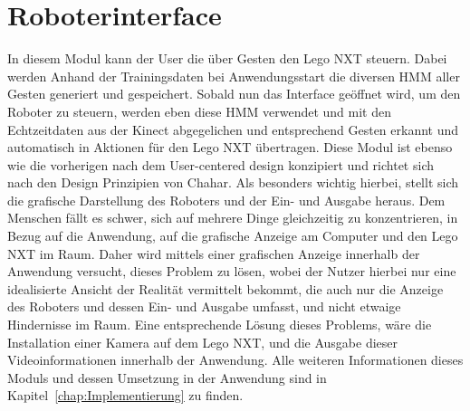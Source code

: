 \section{Roboterinterface}
In diesem Modul kann der User die \"uber Gesten den Lego NXT steuern. Dabei werden Anhand der Trainingsdaten bei Anwendungsstart die diversen \gls{HMM} aller Gesten generiert und gespeichert. Sobald nun das Interface ge\"offnet wird, um den Roboter zu steuern, werden eben diese HMM verwendet und mit den Echtzeitdaten aus der Kinect abgegelichen und entsprechend Gesten erkannt und automatisch in Aktionen f\"ur den Lego NXT \"ubertragen.
\newline
Diese Modul ist ebenso wie die vorherigen nach dem User-centered design konzipiert und richtet sich nach den Design Prinzipien von Chahar. Als besonders wichtig hierbei, stellt sich die grafische Darstellung des Roboters und der Ein- und Ausgabe heraus. Dem Menschen f\"allt es schwer, sich auf mehrere Dinge gleichzeitig zu konzentrieren, in Bezug auf die Anwendung, auf die grafische Anzeige am Computer und den Lego NXT im Raum. Daher wird mittels einer grafischen Anzeige innerhalb der Anwendung versucht, dieses Problem zu l\"osen, wobei der Nutzer hierbei nur eine idealisierte Ansicht der Realit\"at vermittelt bekommt, die auch nur die Anzeige des Roboters und dessen Ein- und Ausgabe umfasst, und nicht etwaige Hindernisse im Raum.
\newline
Eine entsprechende L\"osung dieses Problems, w\"are die Installation einer Kamera auf dem Lego NXT, und die Ausgabe dieser Videoinformationen innerhalb der Anwendung.
\newline
Alle weiteren Informationen dieses Moduls und dessen Umsetzung in der Anwendung sind in Kapitel~\ref{chap:Implementierung} zu finden.